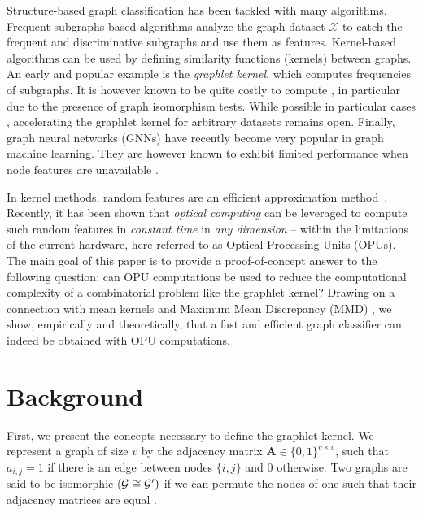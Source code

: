 \documentclass{article}
\begin{document}
Structure-based graph classification has been tackled with many algorithms. Frequent subgraphs based algorithms \cite{frequent_subgraphs} analyze the graph dataset $\mathcal{X}$ to catch the frequent and discriminative subgraphs and use them as features. Kernel-based algorithms \cite{kriege_graph_kernels} can be used by defining similarity functions (kernels) between graphs. An early and popular example is the \emph{graphlet kernel}, which computes frequencies of subgraphs. It is however known to be quite costly to compute \cite{graphlet_kernel}, in particular due to the presence of graph isomorphism tests. While possible in particular cases \cite{graphlet_kernel}, accelerating the graphlet kernel for arbitrary datasets remains open.
Finally, graph neural networks (GNNs) \cite{Bruna2013, Bronstein2017} have recently become very popular in graph machine learning. They are however known to exhibit limited performance when node features are unavailable \cite{GCN_powerful}. %

In kernel methods, random features are an efficient approximation method~\cite{rahimi2008random, RF_1}. Recently, it has been shown \cite{saade_opu} that \emph{optical computing} can be leveraged to compute such random features in \emph{constant time} in \emph{any dimension} -- within the limitations of the current hardware, here referred to as Optical Processing Units (OPUs).
The main goal of this paper is to provide a proof-of-concept answer to the following question: can OPU computations be used to reduce the computational complexity of a combinatorial problem like the graphlet kernel? Drawing on a connection with mean kernels and Maximum Mean Discrepancy (MMD) \cite{Gretton2007}, we show, empirically and theoretically, that a fast and efficient graph classifier can indeed be obtained with OPU computations.

\section{Background}
\label{sec:background}
First, we present the concepts necessary to define the graphlet kernel. We represent a graph of size $v$ by the adjacency matrix $\mathbf{A}\in \{0,1\}^{v\times v}$, such that $a_{i,j} =1$ if there is an edge between nodes $\{i,j\}$ and $0$ otherwise. Two graphs are said to be isomorphic ($\mathcal{G}\cong \mathcal{G}')$ if we can permute the nodes of one such that their adjacency matrices are equal \cite{isomorphism}. 
\end{document}

